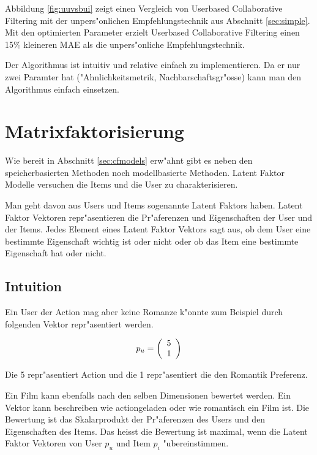 \documentclass[a4paper, 12pt]{article}
\begin{document}
Abbildung \ref{fig:uuvsbui} zeigt einen Vergleich von Userbased Collaborative Filtering mit der unpers"onlichen Empfehlungstechnik aus Abschnitt \ref{sec:simple}. Mit den optimierten Parameter erzielt Userbased Collaborative Filtering einen 15\% kleineren MAE als die unpers"onliche Empfehlungstechnik.

Der Algorithmus ist intuitiv und relative einfach zu implementieren. Da er nur zwei Paramter hat ("Ahnlichkeitsmetrik, Nachbarschaftsgr"osse) kann man den Algorithmus einfach einsetzen. 

\section{Matrixfaktorisierung}
\label{sec:matrixfactorization}

Wie bereit in Abschnitt \ref{sec:cfmodels} erw"ahnt gibt es neben den speicherbasierten Methoden noch modellbasierte Methoden. Latent Faktor Modelle versuchen die Items und die User zu charakterisieren. 

Man geht davon aus Users und Items sogenannte Latent Faktors haben. Latent Faktor Vektoren repr"asentieren die Pr"aferenzen und Eigenschaften der User und der Items. Jedes Element eines Latent Faktor Vektors sagt aus, ob dem User eine bestimmte Eigenschaft wichtig ist oder nicht oder ob das Item eine bestimmte Eigenschaft hat oder nicht. 

\subsection{Intuition}
\label{sec:intuition}

Ein User der Action mag aber keine Romanze k"onnte zum Beispiel durch folgenden Vektor repr"asentiert werden.

\begin{equation}
  \label{eq:vektor}
  p_u = \left(
  \begin{array}[c]{c}
    5 \\
    1 
  \end{array}
\right)
\end{equation}

Die 5 repr"asentiert Action und die 1 repr"asentiert die den Romantik Preferenz.

 Ein Film kann ebenfalls nach den selben Dimensionen bewertet werden. Ein Vektor kann beschreiben wie actiongeladen oder wie romantisch ein Film ist. Die Bewertung ist das Skalarprodukt der Pr"aferenzen des Users und den Eigenschaften des Items. Das heisst die Bewertung ist maximal, wenn die Latent Faktor Vektoren von User $p_u$ und Item $p_i$ "ubereinstimmen.
\end{document}
